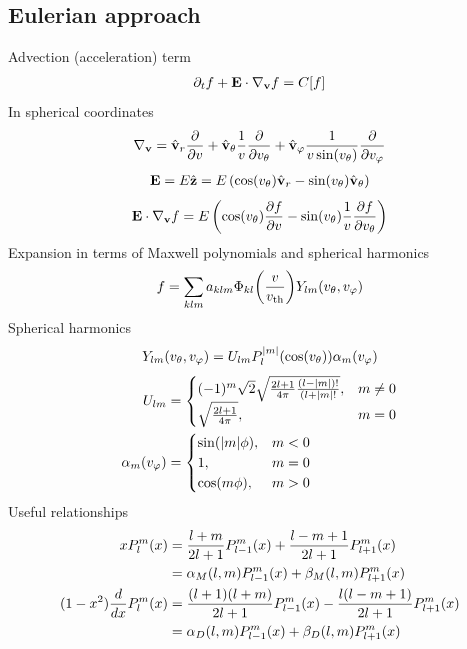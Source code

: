 \documentclass{article}[draft]
\begin{document}
\subsection{Eulerian approach}
Advection (acceleration) term
\begin{align*}
\partial_t f + \mathbf{E}\cdot \nabla_{\mathbf{v}} f = C[f]
\end{align*}
In spherical coordinates
\begin{align*}
\nabla_{\vect{v}} 
= \vrunit \frac{\partial}{\partial \vr}
+ \vthetaunit \frac{1}{\vr} \frac{\partial}{\partial \vtheta}
+ \vphiunit \frac{1}{\vr \sin\of{\vtheta}} \frac{\partial}{\partial \vphi}
\end{align*}
\begin{align*}
\vect{E} 
= E \hat{\vect{z}} 
= E \left( \cos\of{\vtheta} \vrunit - \sin\of{\vtheta} \vthetaunit \right)
\end{align*}
\begin{align*}
\vect{E}\cdot \nabla_{\vect{v}} f
= E 
\left( \cos\of{\vtheta} \frac{\partial f}{\partial \vr} 
- \sin\of{\vtheta} \frac{1}{\vr} \frac{\partial f}{\partial \vtheta} \right)
\end{align*}
Expansion in terms of Maxwell polynomials and spherical harmonics
\begin{align*}
f = 
\sum_{klm} a_{klm} \Phi_{kl}\of{\frac{v}{\vth}} Y_{lm}\of{\vtheta,\vphi}
\end{align*}
Spherical harmonics
\begin{align*}
Y_{lm}\of{\vtheta,\vphi} = U_{lm} P^{|m|}_l\of{\cos\of{\vtheta}} \alpha_m\of{\vphi}
\end{align*}
\begin{align*}
U_{lm} &= 
\begin{cases}
(-1)^m \sqrt{2} \sqrt{\frac{2l+1}{4\pi} \frac{(l-|m|)!}{(l+|m|!}}, &m\neq 0 \\
\sqrt{\frac{2l+1}{4\pi}}, &m = 0
\end{cases}
\\
\alpha_m\of{\vphi}
&=
\begin{cases}
\sin\of{|m|\phi}, &m < 0 \\
1, &m = 0\\
\cos\of{m\phi}, &m > 0
\end{cases}
\end{align*}
Useful relationships
\begin{align*}
x P^m_l\of{x} 
&= \frac{l+m}{2l+1} P^m_{l-1}\of{x}
+ \frac{l-m+1}{2l+1} P^m_{l+1}\of{x}
\\
&= \alpha_M\of{l,m} P^m_{l-1}\of{x}
+ \beta_M\of{l,m} P^m_{l+1}\of{x}
\\
(1-x^2) \frac{d}{dx} P^m_l\of{x} 
&= \frac{(l+1)(l+m)}{2l+1} P^m_{l-1}\of{x} 
- \frac{l(l-m+1)}{2l+1} P^m_{l+1}\of{x}
\\
&= \alpha_D\of{l,m} P^m_{l-1}\of{x} 
+ \beta_D\of{l,m} P^m_{l+1}\of{x}
\end{align*}
\end{document}
